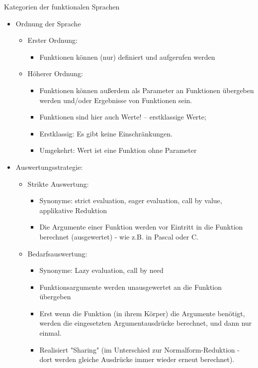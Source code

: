 \documentclass[10pt]{article}
\begin{document}
Kategorien der funktionalen Sprachen
\begin{itemize}
  \item Ordnung der Sprache
        \begin{itemize}
          \item Erster Ordnung:
                \begin{itemize}
                  \item Funktionen können (nur) definiert und aufgerufen werden
                \end{itemize}
          \item Höherer Ordnung:
                \begin{itemize}
                  \item Funktionen können außerdem als Parameter an Funktionen übergeben werden und/oder Ergebnisse von Funktionen sein.
                  \item Funktionen sind hier auch Werte! -- erstklassige Werte;
                  \item Erstklassig: Es gibt keine Einschränkungen.
                  \item Umgekehrt: Wert ist eine Funktion ohne Parameter
                \end{itemize}
        \end{itemize}
  \item Auswertungsstrategie:
        \begin{itemize}
          \item Strikte Auswertung:
                \begin{itemize}
                  \item Synonyme: strict evaluation, eager evaluation, call by value, applikative Reduktion
                  \item Die Argumente einer Funktion werden vor Eintritt in die Funktion berechnet (ausgewertet) - wie z.B. in Pascal oder C.
                \end{itemize}
          \item Bedarfsauswertung:
                \begin{itemize}
                  \item Synonyme: Lazy evaluation, call by need
                  \item Funktionsargumente werden unausgewertet an die Funktion übergeben
                  \item Erst wenn die Funktion (in ihrem Körper) die Argumente benötigt, werden die eingesetzten Argumentausdrücke berechnet, und dann nur einmal.
                  \item Realisiert "Sharing" (im Unterschied zur Normalform-Reduktion - dort werden gleiche Ausdrücke immer wieder erneut berechnet).
                \end{itemize}
        \end{itemize}
\end{itemize}
\end{document}

